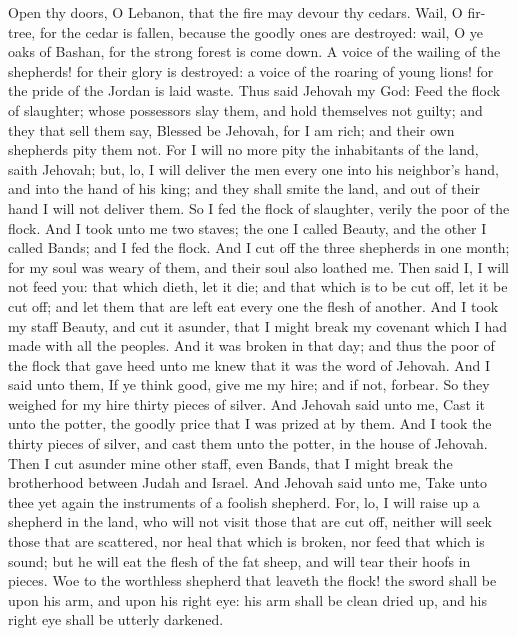 Open thy doors, O Lebanon, that the fire may devour thy cedars. Wail, O fir-tree, for the cedar is fallen, because the goodly ones are destroyed: wail, O ye oaks of Bashan, for the strong forest is come down. A voice of the wailing of the shepherds! for their glory is destroyed: a voice of the roaring of young lions! for the pride of the Jordan is laid waste.  Thus said Jehovah my God: Feed the flock of slaughter; whose possessors slay them, and hold themselves not guilty; and they that sell them say, Blessed be Jehovah, for I am rich; and their own shepherds pity them not. For I will no more pity the inhabitants of the land, saith Jehovah; but, lo, I will deliver the men every one into his neighbor’s hand, and into the hand of his king; and they shall smite the land, and out of their hand I will not deliver them. So I fed the flock of slaughter, verily the poor of the flock. And I took unto me two staves; the one I called Beauty, and the other I called Bands; and I fed the flock. And I cut off the three shepherds in one month; for my soul was weary of them, and their soul also loathed me. Then said I, I will not feed you: that which dieth, let it die; and that which is to be cut off, let it be cut off; and let them that are left eat every one the flesh of another. And I took my staff Beauty, and cut it asunder, that I might break my covenant which I had made with all the peoples. And it was broken in that day; and thus the poor of the flock that gave heed unto me knew that it was the word of Jehovah. And I said unto them, If ye think good, give me my hire; and if not, forbear. So they weighed for my hire thirty pieces of silver. And Jehovah said unto me, Cast it unto the potter, the goodly price that I was prized at by them. And I took the thirty pieces of silver, and cast them unto the potter, in the house of Jehovah. Then I cut asunder mine other staff, even Bands, that I might break the brotherhood between Judah and Israel.  And Jehovah said unto me, Take unto thee yet again the instruments of a foolish shepherd. For, lo, I will raise up a shepherd in the land, who will not visit those that are cut off, neither will seek those that are scattered, nor heal that which is broken, nor feed that which is sound; but he will eat the flesh of the fat sheep, and will tear their hoofs in pieces. Woe to the worthless shepherd that leaveth the flock! the sword shall be upon his arm, and upon his right eye: his arm shall be clean dried up, and his right eye shall be utterly darkened. 

